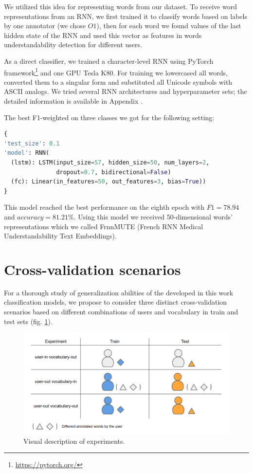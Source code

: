 We utilized this idea for representing words from our dataset. To receive word representations from an RNN, we first trained it to classify words based on labels by one annotator (we chose $O1$), then for each word we found values of the last hidden state of the RNN and used this vector as features in words understandability detection for different users.

As a direct classifier, we trained a character-level RNN using PyTorch framework\footnote{\url{https://pytorch.org/}} and one GPU Tesla K80. For training we lowercased all words, converted them to a singular form and substituted all Unicode symbols with ASCII analogs.  We tried several RNN architectures and hyperparameter sets; the detailed information is available in Appendix \label{appx:rnn}. 


The best F1-weighted on three classes we got for the following setting:

\begin{lstlisting}[language=Python]
{
'test_size': 0.1
'model': RNN(
  (lstm): LSTM(input_size=57, hidden_size=50, num_layers=2,
               dropout=0.7, bidirectional=False)
  (fc): Linear(in_features=50, out_features=3, bias=True))
}
\end{lstlisting}

This model reached the best performance on the eighth epoch with $F1= 78.94$ and $accuracy = 81.21\%$. Using this model we received 50-dimensional words' representations which we called FrnnMUTE (French RNN Medical Understandability Text Embeddings). 


\section{Cross-validation scenarios}
For a thorough study of generalization abilities of the developed in this work classification models, we propose to consider three distinct cross-validation scenarios based on different combinations of users and vocabulary in train and test sets (fig. \ref{fig:experiments-description}).

\begin{figure}[h]
    \centering
    \includegraphics[width=14cm]{Images/Experiments.png}
    \caption{Visual description of experiments.}
    \label{fig:experiments-description}
\end{figure} 

